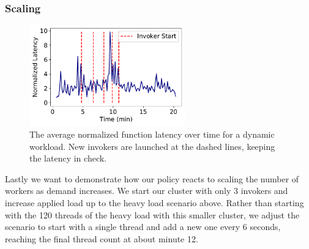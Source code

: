 \subsubsection{Scaling}

\begin{figure}  
  \includegraphics[width=0.6\textwidth]{chrlu/faaslb-osdi22/figs/scaling/scaling_lat_over_time-nolabel.pdf}
  \centering
  \caption{The average normalized function latency over time for a dynamic workload. New invokers are launched at the dashed lines, keeping the latency in check.}
  \label{fig:scaling-latency}
\end{figure}



Lastly we want to demonstrate how our policy reacts to scaling the number of workers as demand increases.
We start our cluster with only 3 invokers and increase applied load up to the heavy load scenario above.
Rather than starting with the 120 threads of the heavy load with this smaller cluster, we adjust the scenario to start with a single thread and add a new one every 6 seconds, reaching the final thread count at about minute 12.

